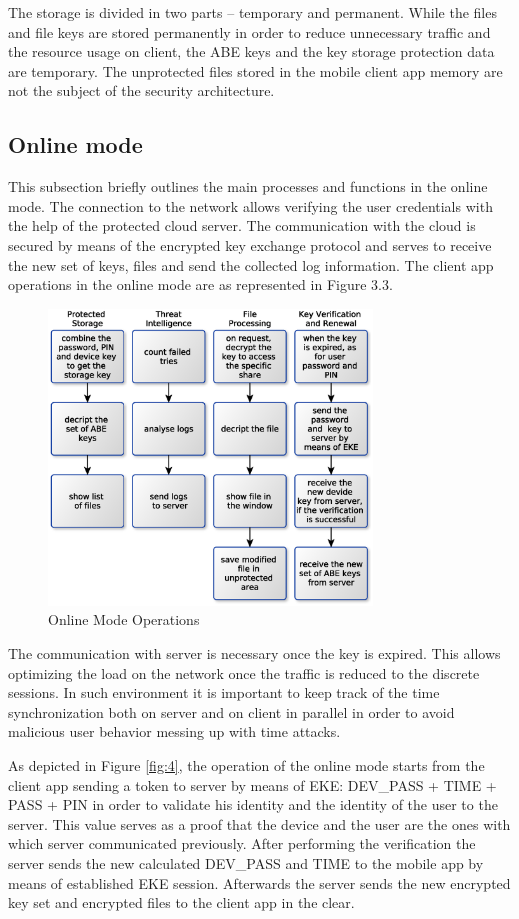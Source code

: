 \documentclass[twocolumn]{svjour3}          %
\begin{document}
The storage is divided in two parts – temporary and permanent. While the files and file keys are stored permanently in order to reduce unnecessary traffic and the resource usage on client, the ABE keys and the key storage protection data are temporary. The unprotected files stored in the mobile client app memory are not the subject of the security architecture.

\subsection{Online mode}
\label{sec_online_mode}
This subsection briefly outlines the main processes and functions in the online mode. The connection to the network allows verifying the user credentials with the help of the protected cloud server. The communication with the cloud is secured by means of the encrypted key exchange protocol \cite{hao2010j, hao2008password} and serves to receive the new set of keys, files and send the collected log information. The client app operations in the online mode are as represented in Figure 3.3.

\begin{figure}[h!]
	\includegraphics[width=8.6cm]{figures/onlinemodeoperations.eps}
	\caption{Online Mode Operations}
	\label{fig:3}
\end{figure}

The communication with server is necessary once the key is expired. This allows optimizing the load on the network once the traffic is reduced to the discrete sessions. In such environment it is important to keep track of the time synchronization both on server and on client in parallel in order to avoid malicious user behavior messing up with time attacks.

As depicted in Figure \ref{fig:4}, the operation of the online mode starts from the client app sending a token to server by means of EKE: DEV\_PASS + TIME + PASS + PIN in order to validate his identity and the identity of the user to the server. This value serves as a proof that the device and the user are the ones with which server communicated previously. After performing the verification the server sends the new calculated DEV\_PASS and TIME to the mobile app by means of established EKE session. Afterwards the server sends the new encrypted key set and encrypted files to the client app in the clear.
\end{document}
